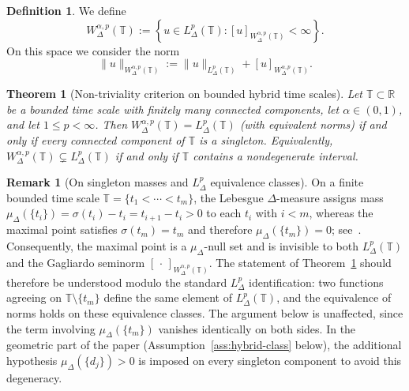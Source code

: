 \documentclass[11pt,a4paper]{article}
\numberwithin{equation}{section}
\newtheorem{theorem}{Theorem}[section]
\theoremstyle{definition}
\newtheorem{definition}[definition]{Definition}
\newtheorem{remark}[remark]{Remark}
\newcommand{\R}{\mathbb{R}}
\newcommand{\T}{\mathbb{T}}
\begin{document}
\begin{definition}\label{def:fractional-space}
We define
\begin{equation}\label{eq:space-def}
W^{\alpha,p}_{\Delta}(\T)
:=
\left\{
u\in L^p_{\Delta}(\T):
[u]_{W^{\alpha,p}_{\Delta}(\T)}<\infty
\right\}.
\end{equation}
On this space we consider the norm
\begin{equation}\label{eq:fractional-norm}
\|u\|_{W^{\alpha,p}_{\Delta}(\T)}
:=
\|u\|_{L^p_{\Delta}(\T)}
+
[u]_{W^{\alpha,p}_{\Delta}(\T)}.
\end{equation}
\end{definition}

\begin{theorem}[Non-triviality criterion on bounded hybrid time scales]\label{thm:nontriviality}
Let $\T\subset\R$ be a bounded time scale with finitely many connected
components, let $\alpha\in(0,1)$, and let $1\le p<\infty$. Then
$W^{\alpha,p}_\Delta(\T) = L^p_\Delta(\T)$ (with equivalent norms)
if and only if every connected component of\/ $\T$ is a singleton.
Equivalently, $W^{\alpha,p}_\Delta(\T)\subsetneq L^p_\Delta(\T)$
if and only if\/ $\T$ contains a nondegenerate interval.
\end{theorem}

\begin{remark}[On singleton masses and $L^p_\Delta$ equivalence classes]\label{rem:nontriv-masses}
On a finite bounded time scale $\T=\{t_1<\cdots<t_m\}$, the Lebesgue
$\Delta$-measure assigns mass $\mu_\Delta(\{t_i\}) = \sigma(t_i)-t_i =
t_{i+1}-t_i > 0$ to each $t_i$ with $i<m$, whereas the maximal point
satisfies $\sigma(t_m) = t_m$ and therefore $\mu_\Delta(\{t_m\}) = 0$;
see~\cite{BohnerGuseinov2006,CabadaVivero2006}. Consequently, the
maximal point is a $\mu_\Delta$-null set and is invisible to both
$L^p_\Delta(\T)$ and the Gagliardo seminorm
$[\,\cdot\,]_{W^{\alpha,p}_\Delta(\T)}$. The statement of
Theorem~\ref{thm:nontriviality} should therefore be understood modulo
the standard $L^p_\Delta$ identification: two functions agreeing on
$\T\setminus\{t_m\}$ define the same element of $L^p_\Delta(\T)$, and
the equivalence of norms holds on these equivalence classes. The
argument below is unaffected, since the term involving
$\mu_\Delta(\{t_m\})$ vanishes identically on both sides. In the
geometric part of the paper (Assumption~\ref{ass:hybrid-class} below),
the additional hypothesis $\mu_\Delta(\{d_j\})>0$ is imposed on every
singleton component to avoid this degeneracy.
\end{remark}
\end{document}
